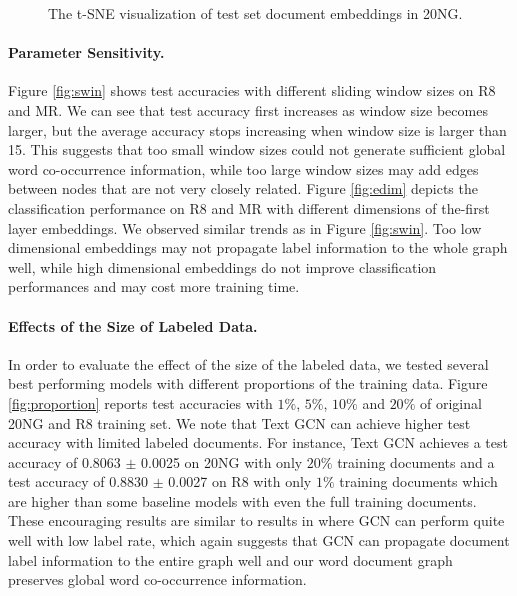 \documentclass[letterpaper]{article} \usepackage{aaai19}  \usepackage{times}  \usepackage{helvet}  \usepackage{courier}  \usepackage{url}  \usepackage{graphicx}  \frenchspacing  \usepackage{amsmath}
\begin{document}
\begin{figure}[t]
\centering
{}


\caption{The t-SNE visualization of test set document embeddings in 20NG.}
\label{fig:doc2vec}
\end{figure}


\paragraph{Parameter Sensitivity.} Figure \ref{fig:swin} shows test accuracies with different sliding window sizes on R8 and MR. We can see that test accuracy first increases as window size becomes larger, but the average accuracy stops increasing when window size is larger than 15. This suggests that too small window sizes could not generate sufficient global word co-occurrence information, while too large window sizes may add edges between nodes that are not very closely related. Figure \ref{fig:edim} depicts the classification performance on R8 and MR with different dimensions of the-first layer embeddings. We observed similar trends as in Figure \ref{fig:swin}. Too low dimensional embeddings may not propagate label information to the whole graph well, while high dimensional embeddings do not improve classification performances and may cost more training time.




\paragraph{Effects of the Size of Labeled Data.} 
 
In order to evaluate the effect of the size of the labeled data, we tested several best performing models with different proportions of the training data. Figure \ref{fig:proportion} reports test accuracies with $1\%$, $5\%$, $10\%$ and $20\%$ of original 20NG and R8 training set. We note that Text GCN can achieve higher test accuracy with limited labeled documents. For instance, Text GCN achieves a test accuracy of 0.8063 $\pm$ 0.0025 on 20NG with only $20\%$ training documents and a test accuracy of 0.8830 $\pm$ 0.0027 on R8 with only $1\%$ training documents which are higher than some baseline models with even the full training documents. These encouraging results are similar to results in \cite{kipf2017semi} where GCN can perform quite well with low label rate, which again suggests that GCN can propagate document label information to the entire graph well and our word document graph preserves global word co-occurrence information. 
\end{document}
